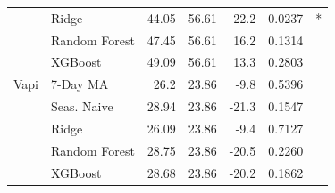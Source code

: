 \begin{table}[htbp]
{\begin{tabular}{llrrrrc}
 & Ridge & 44.05 & 56.61 & 22.2 & 0.0237 & * \\
 & Random Forest & 47.45 & 56.61 & 16.2 & 0.1314 &  \\
 & XGBoost & 49.09 & 56.61 & 13.3 & 0.2803 &  \\
Vapi & 7-Day MA & 26.2 & 23.86 & -9.8 & 0.5396 &  \\
 & Seas. Naive & 28.94 & 23.86 & -21.3 & 0.1547 &  \\
 & Ridge & 26.09 & 23.86 & -9.4 & 0.7127 &  \\
 & Random Forest & 28.75 & 23.86 & -20.5 & 0.2260 &  \\
 & XGBoost & 28.68 & 23.86 & -20.2 & 0.1862 &  \\
\bottomrule
\end{tabular}}
\end{table}